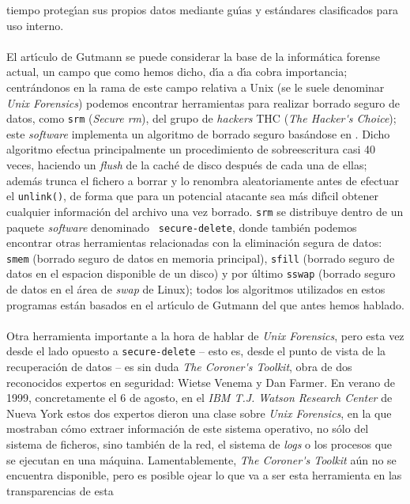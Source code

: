 tiempo proteg\'{\i}an sus propios datos mediante gu\'{\i}as y est\'andares 
clasificados para uso interno.\\
\\El art\'{\i}culo de Gutmann se puede considerar la base de la inform\'atica
forense actual, un campo que como hemos dicho, d\'{\i}a a d\'{\i}a cobra
importancia; centr\'andonos en la rama de este campo relativa a Unix (se le
suele denominar {\it Unix Forensics}) podemos encontrar herramientas para 
realizar borrado seguro de datos, como {\tt srm} ({\it Secure rm}), del grupo
de {\it hackers} THC ({\it The Hacker\'{}s Choice}); este {\it software} 
implementa un algoritmo de borrado seguro bas\'andose en \cite{kn:gut96}. Dicho
algoritmo efectua principalmente un procedimiento de sobreescritura casi 40
veces, haciendo un {\it flush} de la cach\'e de disco despu\'es de cada una de
ellas; adem\'as trunca el fichero a borrar y lo renombra aleatoriamente antes
de efectuar el {\tt unlink()}, de forma que para un potencial atacante sea
m\'as dif\'{\i}cil obtener cualquier informaci\'on del archivo una vez borrado.
{\tt srm} se distribuye dentro de un paquete {\it software} denominado {\tt
secure-delete}, donde tambi\'en podemos encontrar otras herramientas 
relacionadas con la eliminaci\'on segura de datos: {\tt smem} (borrado seguro
de datos en memoria principal), {\tt sfill} (borrado seguro de datos en el
espacion disponible de un disco) y por \'ultimo {\tt sswap} (borrado seguro
de datos en el \'area de {\it swap} de Linux); todos los algoritmos utilizados
en estos programas est\'an basados en el art\'{\i}culo de Gutmann del que 
antes hemos hablado.\\
\\Otra herramienta importante a la hora de hablar de {\it Unix Forensics},
pero esta vez desde el lado opuesto a {\tt secure-delete} -- esto es, desde
el punto de vista de la recuperaci\'on de datos -- 
es sin duda {\it The Coroner\'{}s Toolkit}, obra de dos reconocidos
expertos en seguridad: Wietse Venema y Dan Farmer. En verano de 1999, 
concretamente el 6 de agosto, en el {\it IBM T.J. Watson Research Center} de
Nueva York estos dos expertos dieron una clase sobre {\it Unix Forensics}, en
la que mostraban c\'omo extraer informaci\'on de este sistema operativo, no
s\'olo del sistema de ficheros, sino tambi\'en de la red, el sistema de
{\it logs} o los procesos que se ejecutan en una m\'aquina. Lamentablemente,
{\it The Coroner\'{}s Toolkit} a\'un no se encuentra disponible, pero es
posible ojear lo que va a ser esta herramienta en las transparencias de esta
